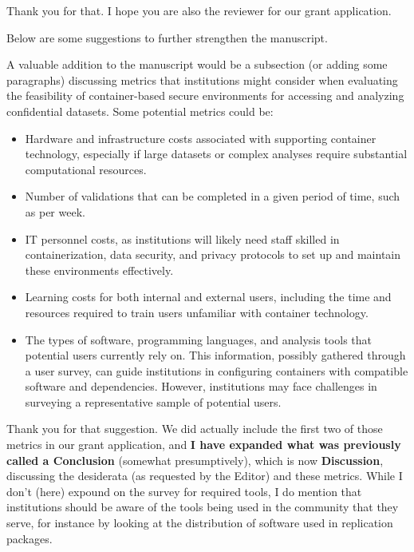 \begin{response}
    Thank you for that. I hope you are also the reviewer for our grant application.
\end{response}

\begin{referee}

Below are some suggestions to further strengthen the manuscript.

A valuable addition to the manuscript would be a subsection (or adding some paragraphs) discussing metrics that institutions might consider when evaluating the feasibility of container-based secure environments for accessing and analyzing confidential datasets.  Some potential metrics could be:
    \begin{itemize}
        \item Hardware and infrastructure costs associated with supporting container technology, especially if large datasets or complex analyses require substantial computational resources. 
        \item Number of validations that can be completed in a given period of time, such as per week. 
        \item IT personnel costs, as institutions will likely need staff skilled in containerization, data security, and privacy protocols to set up and maintain these environments effectively. 
        \item Learning costs for both internal and external users, including the time and resources required to train users unfamiliar with container technology. 
        \item The types of software, programming languages, and analysis tools that potential users currently rely on.  This information, possibly gathered through a user survey, can guide institutions in configuring containers with compatible software and dependencies. However, institutions may face challenges in surveying a representative sample of potential users. 
    \end{itemize}

\end{referee}

\begin{response}
    Thank you for that suggestion. We did actually include the first two of those metrics in our grant application, and \textbf{I have expanded what was previously called a Conclusion} (somewhat presumptively), which is now \textbf{Discussion}, discussing the desiderata (as requested by the Editor) and these metrics. While I don't (here) expound on the survey for required tools, I do mention that institutions should be aware of the tools being used in the community that they serve, for instance by looking at the distribution of software used in replication packages. 
\end{response}

